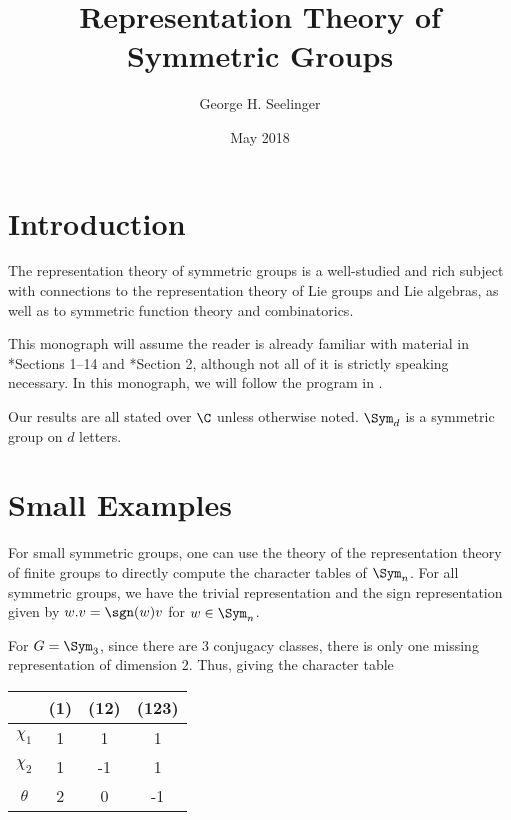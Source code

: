 \documentclass[11pt,leqno,oneside]{amsart}
\title[Representation Theory of Symmetric Groups]{Representation
  Theory of Symmetric Groups}
\author{George H. Seelinger}
\date{May 2018}
\numberwithin{thm}{section}
\begin{document}
\maketitle
\section{Introduction}
The representation theory of symmetric groups is a well-studied and
rich subject with connections to the representation theory of Lie
groups and Lie algebras, as well as to symmetric function theory and
combinatorics.

This monograph will assume the reader is already familiar with
material in \cite{rep-thry-of-finite-gps}*{Sections 1--14} and
\cite{alg-comb}*{Section 
2}, 
although not all of it is 
strictly speaking necessary. In this monograph, we will follow the
program in
\cite{fulton-harris}.

Our results are all stated over \(\C\) unless otherwise
noted. \(\Sym_d\) is a symmetric group on \(d\) letters.
\section{Small Examples}
For small symmetric groups, one can use the theory of the
representation theory of finite groups to directly compute the
character tables of \(\Sym_n\). For all symmetric groups, we have the
trivial representation and the sign representation given by \(w.v =
\sgn(w)v\) for \(w \in \Sym_n\). 
\begin{example}
  For \(G = \Sym_3\), since there are \(3\) conjugacy classes, there
  is only one missing representation of dimension \(2\). Thus, giving
  the character table
  \begin{center}
    \begin{tabular}{c|ccc}
      &(1)&(12)&(123) \\
      \hline
      \(\chi_1\) &1&1&1 \\
      \(\chi_2\) &1&-1&1\\
      \(\theta\) &2&0&-1
    \end{tabular}
  \end{center}
\end{example}
\end{document}
